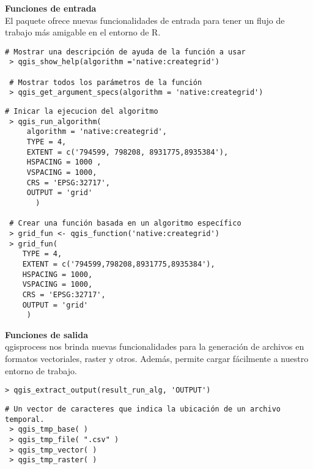 \documentclass{article}
\begin{document}
\begin{multicols*}{3}
\begin{minipage}{\linewidth}
  \vspace{-5pt}
   \textbf{\fontsize{44}{44}\selectfont \textbf{Funciones de entrada}}\vspace{8pt}\\ 
   El paquete ofrece nuevas funcionalidades de entrada para tener un flujo de trabajo más amigable en el entorno de R.
\end{minipage}
\begin{lstlisting}[style=Rstyle]
 # Mostrar una descripción de ayuda de la función a usar
 > qgis_show_help(algorithm ='native:creategrid')

 # Mostrar todos los parámetros de la función
 > qgis_get_argument_specs(algorithm = 'native:creategrid')
\end{lstlisting}
\begin{lstlisting}[style=Rstyle]
 # Inicar la ejecucion del algoritmo
 > qgis_run_algorithm( 
     algorithm = 'native:creategrid',
     TYPE = 4,
     EXTENT = c('794599, 798208, 8931775,8935384'),
     HSPACING = 1000 ,
     VSPACING = 1000,
     CRS = 'EPSG:32717',
     OUTPUT = 'grid'
       )

 # Crear una función basada en un algoritmo específico
 > grid_fun <- qgis_function('native:creategrid')
 > grid_fun(
    TYPE = 4,
    EXTENT = c('794599,798208,8931775,8935384'),
    HSPACING = 1000,
    VSPACING = 1000,
    CRS = 'EPSG:32717',
    OUTPUT = 'grid'
     )
\end{lstlisting}

\begin{minipage}{\linewidth}
  \vspace{12pt}
   \textbf{\fontsize{44}{44}\selectfont \textbf{Funciones de salida}}\vspace{8pt}\\ 
qgisprocess nos brinda nuevas funcionalidades para la generación de archivos en formatos vectoriales, raster y otros. Además, permite cargar fácilmente a nuestro entorno de trabajo.
\end{minipage}

\begin{lstlisting}[style=Rstyle]
 > qgis_extract_output(result_run_alg, 'OUTPUT')
\end{lstlisting}
\begin{lstlisting}[style=Rstyle]
# Un vector de caracteres que indica la ubicación de un archivo temporal.
 > qgis_tmp_base( )
 > qgis_tmp_file( ".csv" )
 > qgis_tmp_vector( )
 > qgis_tmp_raster( )
\end{lstlisting}


\end{multicols*}
\end{document}
